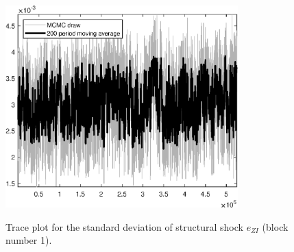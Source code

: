 \begin{figure}[H]
\centering
  \includegraphics[width=0.8\textwidth]{BRS_growth_KPR/graphs/TracePlot_SE_e_ZI_blck_1}\\
    \caption{Trace plot for the standard deviation of structural shock ${e_{ZI}}$ (block number 1).}
\end{figure}
